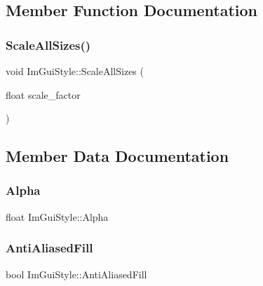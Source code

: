 \subsection{Member Function Documentation}
\hypertarget{struct_im_gui_style_a7c9d3e0974a239f65e433cc952be0627}{}\label{struct_im_gui_style_a7c9d3e0974a239f65e433cc952be0627} 
\subsubsection{\texorpdfstring{Scale\+All\+Sizes()}{ScaleAllSizes()}}
{\footnotesize\ttfamily void Im\+Gui\+Style\+::\+Scale\+All\+Sizes (\begin{DoxyParamCaption}\item[{float}]{scale\+\_\+factor }\end{DoxyParamCaption})}



\subsection{Member Data Documentation}
\hypertarget{struct_im_gui_style_a993312606e9dcb7ca165245150a4da72}{}\label{struct_im_gui_style_a993312606e9dcb7ca165245150a4da72} 
\subsubsection{\texorpdfstring{Alpha}{Alpha}}
{\footnotesize\ttfamily float Im\+Gui\+Style\+::\+Alpha}

\hypertarget{struct_im_gui_style_a1fcc22c258a2a73bd61efd18e7ce7e5a}{}\label{struct_im_gui_style_a1fcc22c258a2a73bd61efd18e7ce7e5a} 
\subsubsection{\texorpdfstring{Anti\+Aliased\+Fill}{AntiAliasedFill}}
{\footnotesize\ttfamily bool Im\+Gui\+Style\+::\+Anti\+Aliased\+Fill}

\hypertarget{struct_im_gui_style_a0164b54454297971d40f3578b2c1ffeb}{}\label{struct_im_gui_style_a0164b54454297971d40f3578b2c1ffeb} 
